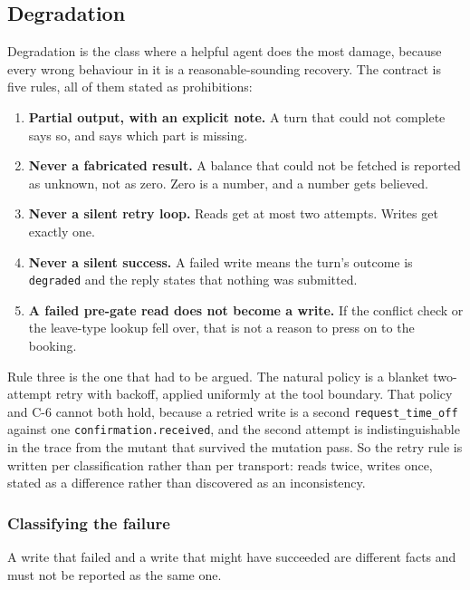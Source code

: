 \documentclass[11pt,a4paper]{article}
\begin{document}
\subsection{Degradation}

Degradation is the class where a helpful agent does the most damage, because every wrong behaviour in it is a reasonable-sounding recovery. The contract is five rules, all of them stated as prohibitions:

\begin{enumerate}[leftmargin=1.6em,itemsep=0.2em]
\item \textbf{Partial output, with an explicit note.} A turn that could not complete says so, and says which part is missing.
\item \textbf{Never a fabricated result.} A balance that could not be fetched is reported as unknown, not as zero. Zero is a number, and a number gets believed.
\item \textbf{Never a silent retry loop.} Reads get at most two attempts. Writes get exactly one.
\item \textbf{Never a silent success.} A failed write means the turn's outcome is \texttt{degraded} and the reply states that nothing was submitted.
\item \textbf{A failed pre-gate read does not become a write.} If the conflict check or the leave-type lookup fell over, that is not a reason to press on to the booking.
\end{enumerate}

Rule three is the one that had to be argued. The natural policy is a blanket two-attempt retry with backoff, applied uniformly at the tool boundary. That policy and C-6 cannot both hold, because a retried write is a second \texttt{request\_time\_off} against one \texttt{confirmation.received}, and the second attempt is indistinguishable in the trace from the mutant that survived the mutation pass. So the retry rule is written per classification rather than per transport: reads twice, writes once, stated as a difference rather than discovered as an inconsistency.

\subsubsection*{Classifying the failure}

A write that failed and a write that might have succeeded are different facts and must not be reported as the same one.
\end{document}
